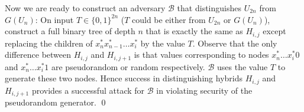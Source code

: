 Now we are ready to construct an adversary $\mathcal{B}$ that  distinguishes $U_{2n}$ from $G(U_n)$: On input $T \in\{0, 1\}^{2n}$ ($T$ could be either from $U_{2n}$ or $G(U_n)$),
construct a full binary tree of depth $n$ that is exactly the same as $H_{i,j}$ except replacing the children of  $x^*_n x^*_{n-1} \ldots x^*_{i}$ by the value $T$.
Observe that the only difference between $H_{i,j}$ and $H_{i,j+1}$ is that values corresponding to nodes $x_n^*\ldots x_i^* 0$ and $x_n^*\ldots x_i^* 1$ are pseudorandom or random respectively. $\mathcal{B}$ uses the value $T$ to generate these two nodes. Hence success in  distinguishing hybrids $H_{i,j}$ and $H_{i,j+1}$ provides a successful attack for $\mathcal{B}$ in violating security of the pseudorandom generator.
\qed

